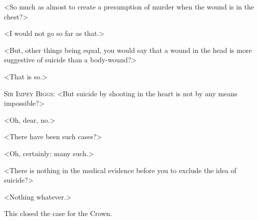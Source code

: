 <So much as almost to create a presumption of murder when the wound is in the chest?>

<I would not go so far as that.>

<But, other things being equal, you would say that a wound in the head is more suggestive of suicide than a body-wound?>

<That is so.>

\begin{a4}
  \enlargethispage{\baselineskip}
\end{a4}

\textsc{Sir Impey Biggs}: <But suicide by shooting in the heart is not by any means impossible?>

<Oh, dear, no.>

<There have been such cases?>

<Oh, certainly; many such.>

<There is nothing in the medical evidence before you to exclude the idea of suicide?>

<Nothing whatever.>

This closed the case for the Crown. 

